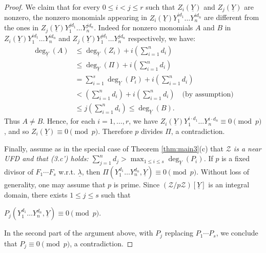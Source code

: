 \documentclass[11pt,a4paper,reqno]{amsart}
\theoremstyle{definition}
\begin{document}
\begin{proof}
\noindent
We claim that for every $0 \leq i<j \leq r$ such that $Z_i(\underline{Y})$ and $Z_j(\underline{Y})$ are nonzero, the nonzero monomials appearing in $Z_i(\underline{Y})Y_1^{id_1}\dots Y_n^{id_n}$ are different from the ones in $Z_j(\underline{Y})Y_1^{jd_1}\dots Y_n^{j d_n}$. Indeed for nonzero monomials $A$ and $B$ in $Z_i(\underline{Y})Y_1^{id_1}\dots Y_n^{id_n}$ and $Z_j(\underline{Y})Y_1^{jd_1}\dots Y_n^{j d_n}$ respectively, we have:
\begin{align*}
\deg_{\underline{Y}}(A) &\leq \deg_{\underline{Y}}(Z_i)+i\left(\sum_{i=1}^n d_i\right)\\
&\leq \deg_{\underline{Y}}(\Pi)+i\left(\sum_{i=1}^n d_i\right)\\
&= \sum_{i=1}^s\deg_{\underline{Y}}(P_i)+i\left(\sum_{i=1}^n d_i\right)\\
&<\left(\sum_{i=1}^n d_i\right)+i\left(\sum_{i=1}^n d_i\right) \quad \textrm{(by assumption)}\\
&\leq j\left(\sum_{i=1}^n d_i\right)\leq \deg_{\underline{Y}}(B).
\end{align*}
Thus $A \neq B$.
Hence, for each $i=1,\ldots, r$, we have $Z_i(\underline{Y})Y_1^{i\cdot d_1}\dots Y_n^{i \cdot d_n}\equiv 0 \pmod{p}$, and so $Z_i(\underline{Y}) \equiv 0 \pmod{p}$. Therefore $p$ divides $\Pi$, a contradiction.

\vskip 2mm


Finally, assume as in the special case of Theorem \ref{thm:main3}(c) that \emph{$\mathcal{Z}$ is a near UFD and that \hbox{\rm (3.c')} holds: $\sum_{j=1}^nd_j> \max_{1 \leq i \leq s}\deg_{\underline{Y}}(P_i)$.} If $p$ is a fixed divisor of $F_1\cdots F_s$ \hbox{w.r.t.} $\underline \lambda$, then $\Pi(Y_1^{d_1}\dots Y_n^{d_n},\underline{Y})\equiv 0 \pmod{p}$. Without loss of generality, one may assume that $p$ is prime. Since $(\mathcal{Z}/p\mathcal{Z})[\underline{Y}]$ is an integral domain, there exists $1 \leq j \leq s$ such that 
\vskip 1mm

\centerline{$P_{j}(Y_1^{d_1}\dots Y_n^{d_n},\underline{Y})\equiv 0 \pmod{p}$.}
\vskip 1mm

\noindent
In the second part of the argument above, with $P_j$ replacing $P_1\cdots P_s$, we conclude that $P_j \equiv 0 \pmod{p}$, a contradiction.
\end{proof}
\end{document}
